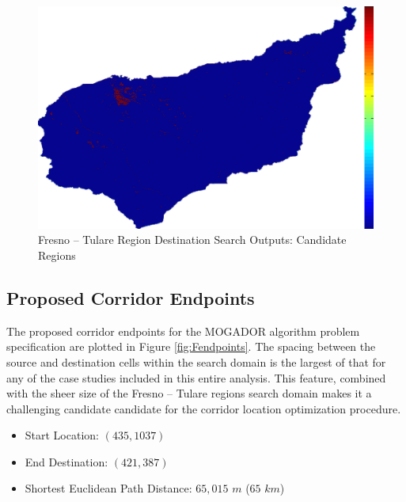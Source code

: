         \begin{figure}[!h]
            \begin{center}
            \includegraphics[width=5.5in]{figures/Fresno_Search_Output.png}   
            \caption{Fresno -- Tulare Region Destination Search Outputs: Candidate Regions}
            \label{fig:Fdsoutputs_cand}
            \end{center}
        \end{figure}

    \subsection{Proposed Corridor Endpoints}
    
The proposed corridor endpoints for the MOGADOR algorithm problem specification are plotted in Figure \ref{fig:Fendpoints}. The spacing between the source and destination cells within the search domain is the largest of that for any of the case studies included  in this entire analysis. This feature, combined with the sheer size of the Fresno -- Tulare regions search domain makes it a challenging candidate candidate for the corridor location optimization procedure. 
    
    \begin{itemize}
      \setlength{\itemsep}{0cm}
      \setlength{\parskip}{0cm}
        \item Start Location: $(435,1037)$
        \item End Destination: $(421,387)$
        \item Shortest Euclidean Path Distance: $65,015$ $m$ ($65$ $km$)
    \end{itemize}
    
